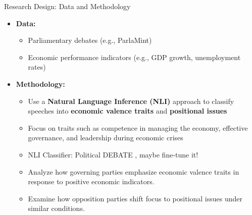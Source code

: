 \documentclass[10pt, aspectratio=169]{beamer}
\newcommand{\customcite}[1]{\textcolor{blue}{\parencite{#1}}}
\begin{document}
    \begin{frame}{Research Design: Data and Methodology}
        \begin{itemize}
            \item \textbf{Data:} 
            \begin{itemize}
                \item Parliamentary debates (e.g., ParlaMint)
                \item Economic performance indicators (e.g., GDP growth, unemployment rates)
            \end{itemize}
            \vspace{0.3cm}
            \item \textbf{Methodology:}
            \begin{itemize}
                \item Use a \textbf{Natural Language Inference (NLI)} approach to classify speeches into \textbf{economic valence traits} and \textbf{positional issues}
                \item Focus on traits such as competence in managing the economy, effective governance, and leadership during economic crises
                \item NLI Classifier: Political DEBATE \customcite{burnham2024political}, maybe fine-tune it!
                \item Analyze how governing parties emphasize economic valence traits in response to positive economic indicators.
                \item Examine how opposition parties shift focus to positional issues under similar conditions.
            \end{itemize}
        \end{itemize}
        \end{frame}
\end{document}
